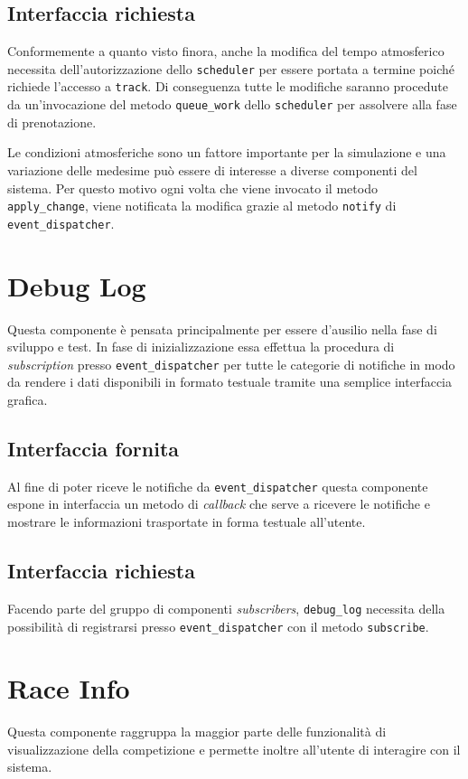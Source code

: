 \documentclass[a4paper]{report}
\newcommand{\fun}[1]{\texttt{#1}}
\begin{document}
\subsection*{Interfaccia richiesta}
Conformemente a quanto visto finora, anche la modifica del tempo atmosferico necessita dell'autorizzazione dello \texttt{scheduler} per essere portata a termine poiché richiede l'accesso a \texttt{track}. Di conseguenza tutte le modifiche saranno procedute da un'invocazione del metodo \fun{queue\_work} dello \texttt{scheduler} per assolvere alla fase di prenotazione.

Le condizioni atmosferiche sono un fattore importante per la simulazione e una variazione delle medesime può essere di interesse a diverse componenti del sistema. Per questo motivo ogni volta che viene invocato il metodo \fun{apply\_change}, viene notificata la modifica grazie al metodo \fun{notify} di \texttt{event\_dispatcher}.

\section{Debug Log}
Questa componente è pensata principalmente per essere d'ausilio nella fase di sviluppo e test. In fase di inizializzazione essa effettua la procedura di \textit{subscription} presso \texttt{event\_dispatcher} per tutte le categorie di notifiche in modo da rendere i dati disponibili in formato testuale tramite una semplice interfaccia grafica.

\subsection*{Interfaccia fornita}
Al fine di poter riceve le notifiche da \texttt{event\_dispatcher} questa componente espone in interfaccia un metodo di \textit{callback} che serve a ricevere le notifiche e mostrare le informazioni trasportate in forma testuale all'utente.

\subsection*{Interfaccia richiesta}
Facendo parte del gruppo di componenti \textit{subscribers}, \texttt{debug\_log} necessita della possibilità di registrarsi presso \texttt{event\_dispatcher} con il metodo \fun{subscribe}.

\section{Race Info}
Questa componente raggruppa la maggior parte delle funzionalità di visualizzazione della competizione e permette inoltre all'utente di interagire con il sistema.
\end{document}
